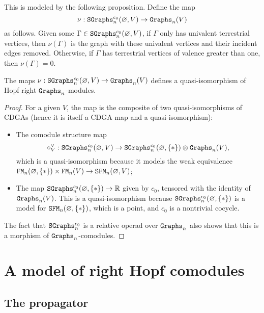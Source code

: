 This is modeled by the following proposition.
Define the map
\begin{equation}
  \nu : \mathtt{SGraphs}_{n}^{c_{0}}(\varnothing, V) \to \mathtt{Graphs}_{n}(V)
\end{equation}
as follows.
Given some $\Gamma \in \mathtt{SGraphs}_{n}^{c_{0}}(\varnothing, V)$, if $\Gamma$ only has univalent terrestrial vertices, then $\nu(\Gamma)$ is the graph with these univalent vertices and their incident edges removed.
Otherwise, if $\Gamma$ has terrestrial vertices of valence greater than one, then $\nu(\Gamma) = 0$.

\begin{proposition}
  \label{cnfbnd.prop.qiso-sc}
  The maps $\nu : \mathtt{SGraphs}_{n}^{c_{0}}(\varnothing, V) \to \mathtt{Graphs}_{n}(V)$ defines a quasi-isomorphism of Hopf right $\mathtt{Graphs}_{n}$-modules.
\end{proposition}
\begin{proof}
  For a given $V$, the map is the composite of two quasi-isomorphisms of CDGAs (hence it is itself a CDGA map and a quasi-isomorphism):
  \begin{itemize}
  \item The comodule structure map
    \[ \circ_{V}^{\vee} : \mathtt{SGraphs}_{n}^{c_{0}}(\varnothing, V) \to \mathtt{SGraphs}_{n}^{c_{0}}(\varnothing, \{*\}) \otimes \mathtt{Graphs}_{n}(V), \]
    which is a quasi-isomorphism because it models the weak equivalence $\mathtt{FM}_{n}(\varnothing, \{*\}) \times \mathtt{FM}_{n}(V) \to \mathtt{SFM}_{n}(\varnothing, V)$;
  \item The map $\mathtt{SGraphs}_{n}^{c_{0}}(\varnothing, \{*\}) \to \mathbb{R}$ given by $c_{0}$, tensored with the identity of $\mathtt{Graphs}_{n}(V)$.
    This is a quasi-isomorphism because $\mathtt{SGraphs}_{n}^{c_{0}}(\varnothing, \{*\})$ is a model for $\mathtt{SFM}_{n}(\varnothing, \{*\})$, which is a point, and $c_{0}$ is a nontrivial cocycle.
  \end{itemize}

  The fact that $\mathtt{SGraphs}_{n}^{c_{0}}$ is a relative operad over $\mathtt{Graphs}_{n}$ also shows that this is a morphism of $\mathtt{Graphs}_{n}$-comodules.
\end{proof}

\section{A model of right Hopf comodules}
\label{sec.model-right-hopf}

\subsection{The propagator}
\label{cnfbnd.sec.propagator}

